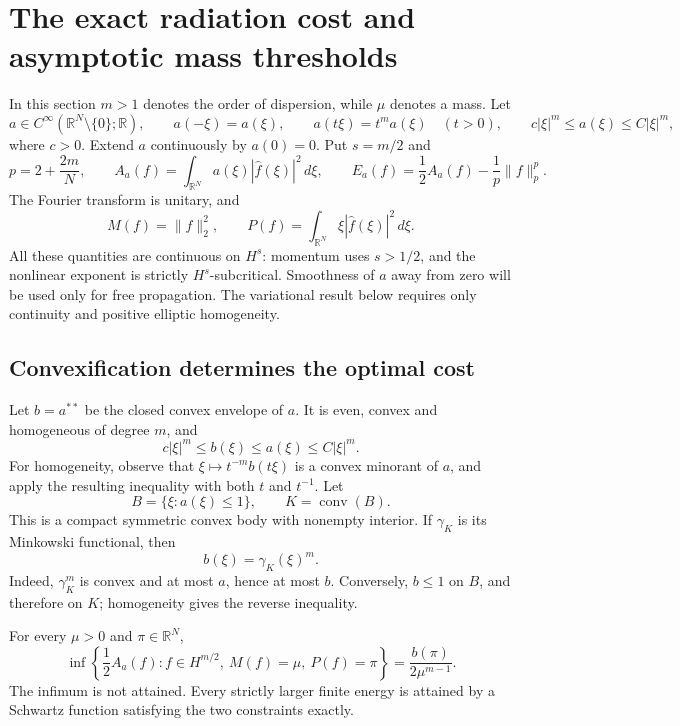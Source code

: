 \section{The exact radiation cost and asymptotic mass thresholds}

In this section $m>1$ denotes the order of dispersion, while $\mu$ denotes a mass. Let
\[
 a\in C^\infty(\mathbb R^N\setminus\{0\};\mathbb R),\qquad
 a(-\xi)=a(\xi),\qquad a(t\xi)=t^m a(\xi)\quad(t>0),
 \qquad c|\xi|^m\le a(\xi)\le C|\xi|^m,
\]
where $c>0$. Extend $a$ continuously by $a(0)=0$. Put $s=m/2$ and
\[
 p=2+\frac{2m}{N},\qquad
 A_a(f)=\int_{\mathbb R^N}a(\xi)|\widehat f(\xi)|^2\,d\xi,
 \qquad E_a(f)=\frac12A_a(f)-\frac1p\|f\|_p^p.
\]
The Fourier transform is unitary, and
\[
 M(f)=\|f\|_2^2,\qquad P(f)=\int_{\mathbb R^N}\xi|\widehat f(\xi)|^2\,d\xi.
\]
All these quantities are continuous on $H^s$: momentum uses $s>1/2$, and the nonlinear exponent is strictly $H^s$-subcritical. Smoothness of $a$ away from zero will be used only for free propagation. The variational result below requires only continuity and positive elliptic homogeneity.

\subsection{Convexification determines the optimal cost}

Let $b=a^{**}$ be the closed convex envelope of $a$. It is even, convex and homogeneous of degree $m$, and
\[
 c|\xi|^m\le b(\xi)\le a(\xi)\le C|\xi|^m.
\]
For homogeneity, observe that $\xi\mapsto t^{-m}b(t\xi)$ is a convex minorant of $a$, and apply the resulting inequality with both $t$ and $t^{-1}$. Let
\[
 B=\{\xi:a(\xi)\le1\},\qquad K=\operatorname{conv}(B).
\]
This is a compact symmetric convex body with nonempty interior. If $\gamma_K$ is its Minkowski functional, then
\begin{equation}\label{eq:r8-convexified-gauge}
 b(\xi)=\gamma_K(\xi)^m.
\end{equation}
Indeed, $\gamma_K^m$ is convex and at most $a$, hence at most $b$. Conversely, $b\le1$ on $B$, and therefore on $K$; homogeneity gives the reverse inequality.

\begin{theorem}\label{thm:r8-radiation-cost}
For every $\mu>0$ and $\pi\in\mathbb R^N$,
\[
 \inf\left\{\frac12 A_a(f):f\in H^{m/2},\ M(f)=\mu,\ P(f)=\pi\right\}
 =\frac{b(\pi)}{2\mu^{m-1}}.
\]
The infimum is not attained. Every strictly larger finite energy is attained by a Schwartz function satisfying the two constraints exactly.
\end{theorem}

